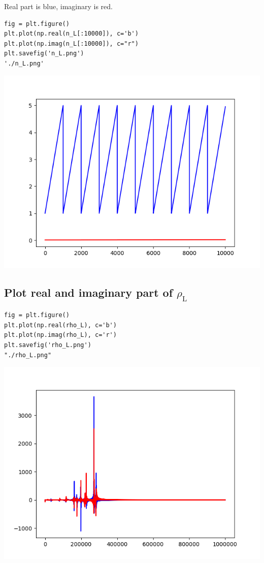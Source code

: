 \documentclass[11pt]{article}
\begin{document}
Real part is blue, imaginary is red.

\begin{verbatim}
fig = plt.figure()
plt.plot(np.real(n_L[:10000]), c='b')
plt.plot(np.imag(n_L[:10000]), c="r")
plt.savefig('n_L.png')
'./n_L.png'

\end{verbatim}

\begin{center}
\includegraphics[width=.9\linewidth]{./n_L.png}
\end{center}

\subsection{Plot real and imaginary part of \(\rho_{\text{L}}\)}
\label{sec:orgf5fa55e}

\begin{verbatim}
fig = plt.figure()
plt.plot(np.real(rho_L), c='b')
plt.plot(np.imag(rho_L), c='r')
plt.savefig('rho_L.png')
"./rho_L.png"
\end{verbatim}

\begin{center}
\includegraphics[width=.9\linewidth]{./rho_L.png}
\end{center}
\end{document}
